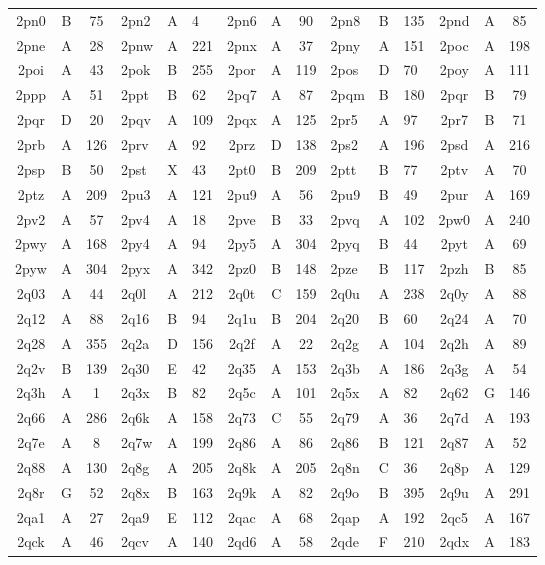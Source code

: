 \begin{longtable}{|c|c|c| a|a|a| c|c|c| a|a|a| c|c|c|}
2pn0 & B & 75 & 2pn2 & A & 4 & 2pn6 & A & 90 & 2pn8 & B & 135 & 2pnd & A & 85\\
2pne & A & 28 & 2pnw & A & 221 & 2pnx & A & 37 & 2pny & A & 151 & 2poc & A & 198\\
2poi & A & 43 & 2pok & B & 255 & 2por & A & 119 & 2pos & D & 70 & 2poy & A & 111\\
2ppp & A & 51 & 2ppt & B & 62 & 2pq7 & A & 87 & 2pqm & B & 180 & 2pqr & B & 79\\
2pqr & D & 20 & 2pqv & A & 109 & 2pqx & A & 125 & 2pr5 & A & 97 & 2pr7 & B & 71\\
2prb & A & 126 & 2prv & A & 92 & 2prz & D & 138 & 2ps2 & A & 196 & 2psd & A & 216\\
2psp & B & 50 & 2pst & X & 43 & 2pt0 & B & 209 & 2ptt & B & 77 & 2ptv & A & 70\\
2ptz & A & 209 & 2pu3 & A & 121 & 2pu9 & A & 56 & 2pu9 & B & 49 & 2pur & A & 169\\
2pv2 & A & 57 & 2pv4 & A & 18 & 2pve & B & 33 & 2pvq & A & 102 & 2pw0 & A & 240\\
2pwy & A & 168 & 2py4 & A & 94 & 2py5 & A & 304 & 2pyq & B & 44 & 2pyt & A & 69\\
2pyw & A & 304 & 2pyx & A & 342 & 2pz0 & B & 148 & 2pze & B & 117 & 2pzh & B & 85\\
2q03 & A & 44 & 2q0l & A & 212 & 2q0t & C & 159 & 2q0u & A & 238 & 2q0y & A & 88\\
2q12 & A & 88 & 2q16 & B & 94 & 2q1u & B & 204 & 2q20 & B & 60 & 2q24 & A & 70\\
2q28 & A & 355 & 2q2a & D & 156 & 2q2f & A & 22 & 2q2g & A & 104 & 2q2h & A & 89\\
2q2v & B & 139 & 2q30 & E & 42 & 2q35 & A & 153 & 2q3b & A & 186 & 2q3g & A & 54\\
2q3h & A & 1 & 2q3x & B & 82 & 2q5c & A & 101 & 2q5x & A & 82 & 2q62 & G & 146\\
2q66 & A & 286 & 2q6k & A & 158 & 2q73 & C & 55 & 2q79 & A & 36 & 2q7d & A & 193\\
2q7e & A & 8 & 2q7w & A & 199 & 2q86 & A & 86 & 2q86 & B & 121 & 2q87 & A & 52\\
2q88 & A & 130 & 2q8g & A & 205 & 2q8k & A & 205 & 2q8n & C & 36 & 2q8p & A & 129\\
2q8r & G & 52 & 2q8x & B & 163 & 2q9k & A & 82 & 2q9o & B & 395 & 2q9u & A & 291\\
2qa1 & A & 27 & 2qa9 & E & 112 & 2qac & A & 68 & 2qap & A & 192 & 2qc5 & A & 167\\
2qck & A & 46 & 2qcv & A & 140 & 2qd6 & A & 58 & 2qde & F & 210 & 2qdx & A & 183\\

\end{longtable}
